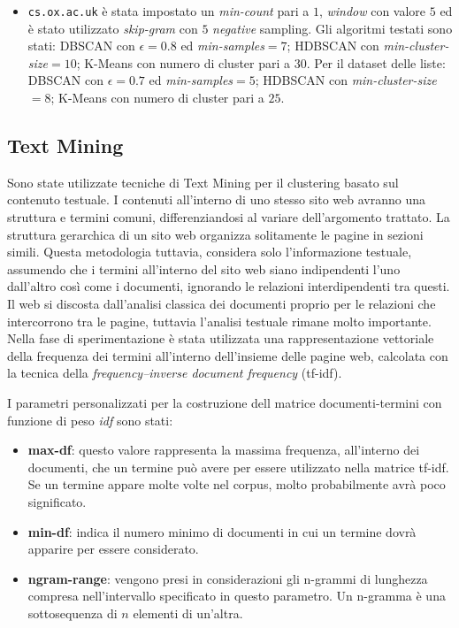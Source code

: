 \begin{itemize}
\item \texttt{cs.ox.ac.uk} è stata impostato un \textit{min-count} pari a $1$, \textit{window} con valore $5$ ed è stato utilizzato \textit{skip-gram} con $5$ \textit{negative} sampling. Gli algoritmi testati sono stati: DBSCAN con $\epsilon = 0.8$ ed \textit{min-samples}$ = 7$; HDBSCAN con \textit{min-cluster-size}$=10$; K-Means con numero di cluster pari a $30$. Per il dataset delle liste: DBSCAN con $\epsilon = 0.7$ ed \textit{min-samples}$ = 5$; HDBSCAN con \textit{min-cluster-size}$=8$; K-Means con numero di cluster pari a $25$.
\end{itemize}

\subsection{Text Mining}
Sono state utilizzate tecniche di Text Mining per il clustering basato sul contenuto testuale. I contenuti all'interno di uno stesso sito web avranno una struttura e termini comuni, differenziandosi al variare dell'argomento trattato. La struttura gerarchica di un sito web organizza solitamente le pagine in sezioni simili. Questa metodologia tuttavia, considera solo l'informazione testuale, assumendo che i termini all'interno del sito web siano indipendenti l'uno dall'altro così come i documenti, ignorando le relazioni interdipendenti tra questi. Il web si discosta dall'analisi classica dei documenti proprio per le relazioni che intercorrono tra le pagine, tuttavia l'analisi testuale rimane molto importante.
\\
Nella fase di sperimentazione è stata utilizzata una rappresentazione vettoriale della frequenza dei termini all'interno dell'insieme delle pagine web, calcolata con la tecnica della \textit{frequency–inverse document frequency} (tf-idf).

I parametri personalizzati per la costruzione dell matrice documenti-termini con funzione di peso \textit{idf} sono stati:
\begin{itemize}
\item \textbf{max-df}: questo valore rappresenta la massima frequenza, all'interno dei documenti, che un termine può avere per essere utilizzato nella matrice tf-idf. Se un termine appare molte volte nel corpus, molto probabilmente avrà poco significato.
\item \textbf{min-df}: indica il numero minimo di documenti in cui un termine dovrà apparire per essere considerato.
\item \textbf{ngram-range}: vengono presi in considerazioni gli n-grammi di lunghezza compresa nell'intervallo specificato in questo parametro. Un n-gramma è una sottosequenza  di $n$ elementi di un'altra.
\end{itemize}

